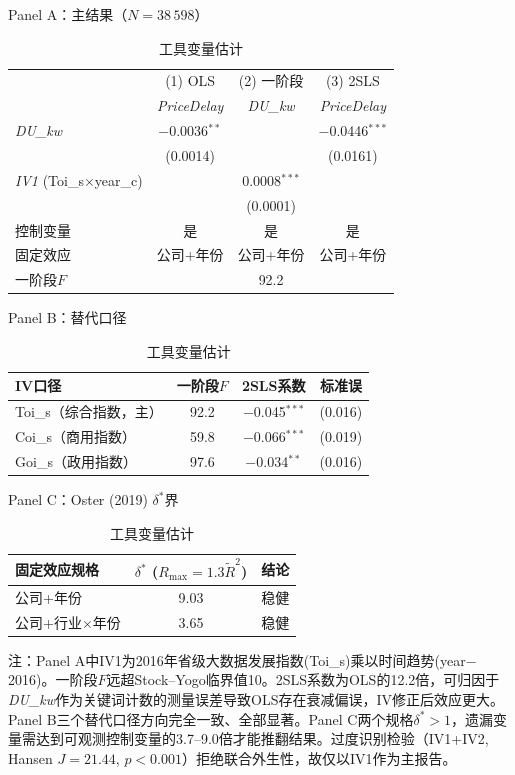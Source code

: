 \documentclass[11pt,a4paper]{article}
\newcommand{\hei}{\CJKfamily{hei}}
\begin{document}
\begin{table}[htbp]
\centering
\caption{工具变量估计}
\label{tab:iv}
\small

\vspace{4pt}
{\hei Panel A：主结果（$N=38\,598$）}
\vspace{4pt}

\begin{tabular}{l*{3}{c}}
\toprule
 & (1) OLS & (2) 一阶段 & (3) 2SLS \\
 & \textit{PriceDelay} & \textit{DU\_kw} & \textit{PriceDelay} \\
\midrule
\textit{DU\_kw}
 & $-$0.0036$^{**}$ & & $-$0.0446$^{***}$ \\
 & (0.0014) & & (0.0161) \\[4pt]
\textit{IV1} (Toi\_s$\times$year\_c)
 & & 0.0008$^{***}$ & \\
 & & (0.0001) & \\[4pt]
\midrule
控制变量 & 是 & 是 & 是 \\
固定效应 & 公司+年份 & 公司+年份 & 公司+年份 \\
一阶段$F$ & & 92.2 & \\
\bottomrule
\end{tabular}

\vspace{14pt}
{\hei Panel B：替代口径}
\vspace{4pt}

\begin{tabular}{lccc}
\toprule
IV口径 & 一阶段$F$ & 2SLS系数 & 标准误 \\
\midrule
Toi\_s（综合指数，主） & 92.2 & $-$0.045$^{***}$ & (0.016) \\
Coi\_s（商用指数） & 59.8 & $-$0.066$^{***}$ & (0.019) \\
Goi\_s（政用指数） & 97.6 & $-$0.034$^{**}$ & (0.016) \\
\bottomrule
\end{tabular}

\vspace{14pt}
{\hei Panel C：Oster (2019) $\delta^*$界}
\vspace{4pt}

\begin{tabular}{lcc}
\toprule
固定效应规格 & $\delta^*$ ($R_{\max}=1.3\tilde{R}^2$) & 结论 \\
\midrule
公司+年份 & 9.03 & 稳健 \\
公司+行业$\times$年份 & 3.65 & 稳健 \\
\bottomrule
\end{tabular}

\vspace{6pt}
{\footnotesize 注：Panel A中IV1为2016年省级大数据发展指数(Toi\_s)乘以时间趋势(year$-$2016)。一阶段$F$远超Stock--Yogo临界值10。2SLS系数为OLS的12.2倍，可归因于\textit{DU\_kw}作为关键词计数的测量误差导致OLS存在衰减偏误，IV修正后效应更大。Panel B三个替代口径方向完全一致、全部显著。Panel C两个规格$\delta^*>1$，遗漏变量需达到可观测控制变量的3.7--9.0倍才能推翻结果。过度识别检验（IV1+IV2, Hansen $J=21.44$, $p<0.001$）拒绝联合外生性，故仅以IV1作为主报告。}
\end{table}
\end{document}
